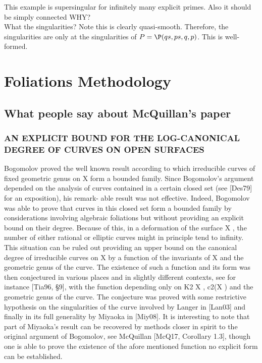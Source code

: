 \documentclass[12pt]{article}
\begin{document}
This example is supersingular for infinitely many explicit primes. Also it should be simply connected {\color{red} WHY?}
\bigskip\\
What the singularities? Note this is clearly quasi-smooth. Therefore, the singularities are only at the singularities of $P = \P(qs, ps, q, p)$. This is well-formed. 

\section{Foliations Methodology}

\subsection{What people say about McQuillan's paper}

\subsubsection{AN EXPLICIT BOUND FOR THE LOG-CANONICAL DEGREE OF CURVES ON
OPEN SURFACES}

Bogomolov proved the well known result according to which irreducible curves of fixed
geometric genus on X form a bounded family. Since Bogomolov’s argument depended on the
analysis of curves contained in a certain closed set (see [Des79] for an exposition), his remark-
able result was not effective. Indeed, Bogomolov was able to prove that curves in this closed set
form a bounded family by considerations involving algebraic foliations but without providing an
explicit bound on their degree. Because of this, in a deformation of the surface X , the number of
either rational or elliptic curves might in principle tend to infinity. This situation can be ruled
out providing an upper bound on the canonical degree of irreducible curves on X by a function
of the invariants of X and the geometric genus of the curve. The existence of such a function
and its form was then conjectured in various places and in slightly different contexts, see for
instance [Tia96, §9], with the function depending only on K2
X , c2(X ) and the geometric genus of
the curve. The conjecture was proved with some restrictive hypothesis on the singularities of the
curve involved by Langer in [Lan03] and finally in its full generality by Miyaoka in [Miy08]. It
is interesting to note that part of Miyaoka’s result can be recovered by methods closer in spirit to
the original argument of Bogomolov, see McQuillan [McQ17, Corollary 1.3], though one is able to
prove the existence of the afore mentioned function no explicit form can be established.
\end{document}
